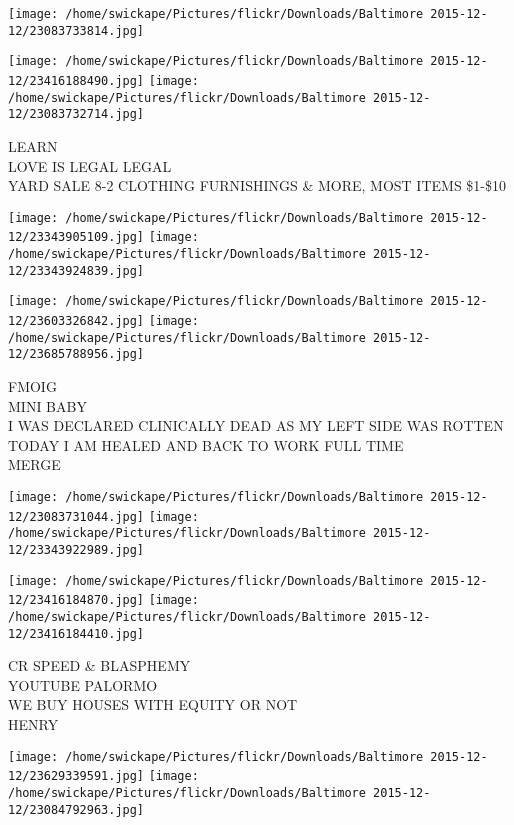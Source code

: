 \documentclass[10pt,letterpaper]{article}
\begin{document}
\texttt{[image: /home/swickape/Pictures/flickr/Downloads/Baltimore 2015-12-12/23083733814.jpg]}

\vspace{0.25in}
\texttt{[image: /home/swickape/Pictures/flickr/Downloads/Baltimore 2015-12-12/23416188490.jpg]}
\texttt{[image: /home/swickape/Pictures/flickr/Downloads/Baltimore 2015-12-12/23083732714.jpg]}

LEARN\\
LOVE IS LEGAL LEGAL\\
YARD SALE 8{-}2 CLOTHING FURNISHINGS \& MORE, MOST ITEMS \$1{-}\$10\\
\pagebreak

\texttt{[image: /home/swickape/Pictures/flickr/Downloads/Baltimore 2015-12-12/23343905109.jpg]}
\texttt{[image: /home/swickape/Pictures/flickr/Downloads/Baltimore 2015-12-12/23343924839.jpg]}

\texttt{[image: /home/swickape/Pictures/flickr/Downloads/Baltimore 2015-12-12/23603326842.jpg]}
\texttt{[image: /home/swickape/Pictures/flickr/Downloads/Baltimore 2015-12-12/23685788956.jpg]}

FMOIG\\
MINI BABY\\
I WAS DECLARED CLINICALLY DEAD AS MY LEFT SIDE WAS ROTTEN TODAY I AM HEALED AND BACK TO WORK FULL TIME\\
MERGE\\
\pagebreak

\texttt{[image: /home/swickape/Pictures/flickr/Downloads/Baltimore 2015-12-12/23083731044.jpg]}
\texttt{[image: /home/swickape/Pictures/flickr/Downloads/Baltimore 2015-12-12/23343922989.jpg]}

\texttt{[image: /home/swickape/Pictures/flickr/Downloads/Baltimore 2015-12-12/23416184870.jpg]}
\texttt{[image: /home/swickape/Pictures/flickr/Downloads/Baltimore 2015-12-12/23416184410.jpg]}

CR SPEED \& BLASPHEMY\\
YOUTUBE PALORMO\\
WE BUY HOUSES WITH EQUITY OR NOT\\
HENRY\\
\pagebreak

\texttt{[image: /home/swickape/Pictures/flickr/Downloads/Baltimore 2015-12-12/23629339591.jpg]}
\texttt{[image: /home/swickape/Pictures/flickr/Downloads/Baltimore 2015-12-12/23084792963.jpg]}
\end{document}
